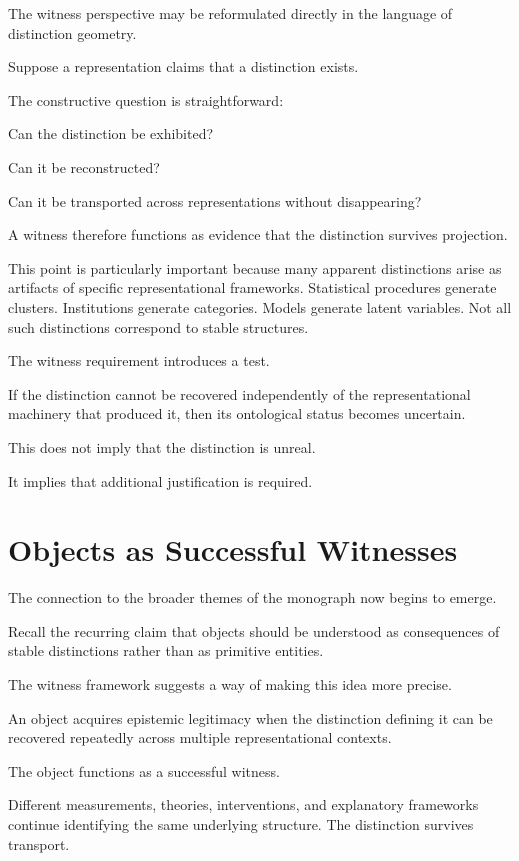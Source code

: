 \documentclass[11pt,oneside,openany]{book}
\begin{document}
The witness perspective may be reformulated directly in the language of distinction geometry.

Suppose a representation claims that a distinction exists.

The constructive question is straightforward:

Can the distinction be exhibited?

Can it be reconstructed?

Can it be transported across representations without disappearing?

A witness therefore functions as evidence that the distinction survives projection.

This point is particularly important because many apparent distinctions arise as artifacts of specific representational frameworks. Statistical procedures generate clusters. Institutions generate categories. Models generate latent variables. Not all such distinctions correspond to stable structures.

The witness requirement introduces a test.

If the distinction cannot be recovered independently of the representational machinery that produced it, then its ontological status becomes uncertain.

This does not imply that the distinction is unreal.

It implies that additional justification is required.

\section{Objects as Successful Witnesses}

The connection to the broader themes of the monograph now begins to emerge.

Recall the recurring claim that objects should be understood as consequences of stable distinctions rather than as primitive entities.

The witness framework suggests a way of making this idea more precise.

An object acquires epistemic legitimacy when the distinction defining it can be recovered repeatedly across multiple representational contexts.

The object functions as a successful witness.

Different measurements, theories, interventions, and explanatory frameworks continue identifying the same underlying structure. The distinction survives transport.
\end{document}
